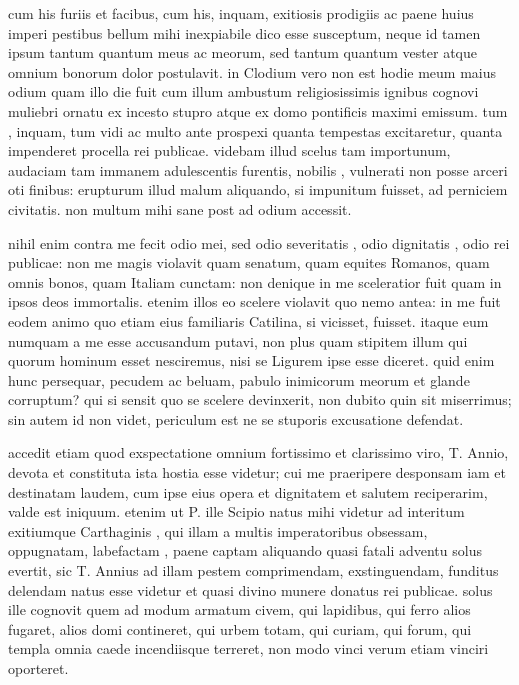  cum his furiis et facibus, cum his, inquam, exitiosis prodigiis ac paene huius imperi pestibus bellum mihi inexpiabile dico esse susceptum, neque id tamen ipsum tantum quantum meus ac meorum, sed tantum quantum vester atque omnium bonorum dolor postulavit. in Clodium vero non est hodie meum maius odium quam illo die fuit cum illum ambustum religiosissimis ignibus cognovi muliebri ornatu ex incesto stupro atque ex domo pontificis maximi emissum. tum , inquam, tum vidi ac multo ante prospexi quanta tempestas excitaretur, quanta impenderet procella rei publicae. videbam illud scelus tam importunum, audaciam tam immanem adulescentis furentis, nobilis , vulnerati non posse arceri oti finibus: erupturum illud malum aliquando, si impunitum fuisset, ad perniciem civitatis. non multum mihi sane post ad odium accessit.

 nihil enim contra me fecit odio mei, sed odio severitatis , odio dignitatis , odio rei publicae: non me magis violavit quam senatum, quam equites Romanos, quam omnis bonos, quam Italiam cunctam: non denique in me sceleratior fuit quam in ipsos deos immortalis. etenim illos eo scelere violavit quo nemo antea: in me fuit eodem animo quo etiam eius familiaris Catilina, si vicisset, fuisset. itaque eum numquam a me esse accusandum putavi, non plus quam stipitem illum qui quorum hominum esset nesciremus, nisi se Ligurem ipse esse diceret. quid enim hunc persequar, pecudem ac beluam, pabulo inimicorum meorum et glande corruptum? qui si sensit quo se scelere devinxerit, non dubito quin sit miserrimus; sin autem id non videt, periculum est ne se stuporis excusatione defendat.

 accedit etiam quod exspectatione omnium fortissimo et clarissimo viro, T. Annio, devota et constituta ista hostia esse videtur; cui me praeripere desponsam iam et destinatam laudem, cum ipse eius opera et dignitatem et salutem reciperarim, valde est iniquum. etenim ut P. ille Scipio natus mihi videtur ad interitum exitiumque Carthaginis , qui illam a multis imperatoribus obsessam, oppugnatam, labefactam , paene captam aliquando quasi fatali adventu solus evertit, sic T. Annius ad illam pestem comprimendam, exstinguendam, funditus delendam natus esse videtur et quasi divino munere donatus rei publicae. solus ille cognovit quem ad modum armatum civem, qui lapidibus, qui ferro alios fugaret, alios domi contineret, qui urbem totam, qui curiam, qui forum, qui templa omnia caede incendiisque terreret, non modo vinci verum etiam vinciri oporteret.

